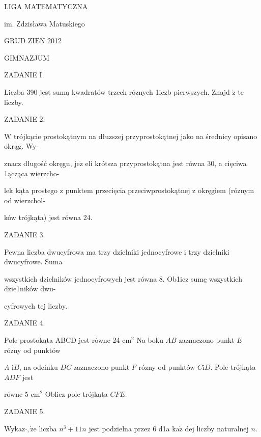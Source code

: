 \documentclass[a4paper,12pt]{article}
\begin{document}
LIGA MATEMATYCZNA

im. Zdzisława Matuskiego

GRUD Z$\mathrm{I}\mathrm{E}\acute{\mathrm{N}}$ 2012

GIMNAZJUM

ZADANIE I.

Liczba 390 jest sumą kwadratów trzech róznych 1iczb pierwszych. Znajd $\acute{\mathrm{z}}$ te liczby.

ZADANIE 2.

$\mathrm{W}$ trójkącie prostokątnym na dłuzszej przyprostokątnej jako na średnicy opisano okrąg. Wy-

znacz długość okręgu, $\mathrm{j}\mathrm{e}\dot{\mathrm{z}}$ eli krótsza przyprostokątna jest równa 30, a cięciwa 1ącząca wierzcho-

lek kąta prostego z punktem przecięcia przeciwprostokątnej z okręgiem (róznym od wierzchol-

ków trójkąta) jest równa 24.

ZADANIE 3.

Pewna liczba dwucyfrowa ma trzy dzielniki jednocyfrowe i trzy dzielniki dwucyfrowe. Suma

wszystkich dzielników jednocyfrowych jest równa 8. Ob1icz sumę wszystkich dzie1ników dwu-

cyfrowych tej liczby.

ZADANIE 4.

Pole prostokąta ABCD jest równe 24 $\mathrm{c}\mathrm{m}^{2}$ Na boku $AB$ zaznaczono punkt $E$ rózny od punktów

{\it A} $\mathrm{i}B$, na odcinku $DC$ zaznaczono punkt $F$ rózny od punktów $C\mathrm{i}D$. Pole trójkąta $ADF$ jest

równe 5 $\mathrm{c}\mathrm{m}^{2}$ Oblicz pole trójkąta $CFE.$

ZADANIE 5.

Wykaz$\cdot, \dot{\mathrm{z}}\mathrm{e}$ liczba $n^{3}+11n$ jest podzielna przez 6 d1a $\mathrm{k}\mathrm{a}\dot{\mathrm{z}}$ dej liczby naturalnej $n.$
\end{document}
